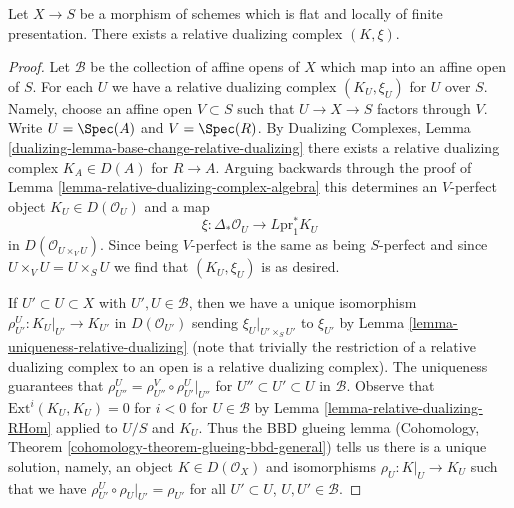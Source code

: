 \begin{lemma}
\label{lemma-existence-relative-dualizing}
Let $X \to S$ be a morphism of schemes which is
flat and locally of finite presentation.
There exists a relative dualizing complex $(K, \xi)$.
\end{lemma}

\begin{proof}
Let $\mathcal{B}$ be the collection of affine opens of
$X$ which map into an affine open of $S$. For each $U$
we have a relative dualizing complex $(K_U, \xi_U)$ for
$U$ over $S$. Namely, choose an affine open
$V \subset S$ such that $U \to X \to S$ factors through $V$.
Write $U = \Spec(A)$ and $V = \Spec(R)$. By
Dualizing Complexes, Lemma \ref{dualizing-lemma-base-change-relative-dualizing}
there exists a relative dualizing complex $K_A \in D(A)$
for $R \to A$. Arguing backwards through the proof of
Lemma \ref{lemma-relative-dualizing-complex-algebra}
this determines an $V$-perfect object $K_U \in D(\mathcal{O}_U)$
and a map
$$
\xi : \Delta_*\mathcal{O}_U \to L\text{pr}_1^*K_U
$$
in $D(\mathcal{O}_{U \times_V U})$. Since being $V$-perfect is the
same as being $S$-perfect and since $U \times_V U = U \times_S U$
we find that $(K_U, \xi_U)$ is as desired.

\medskip\noindent
If $U' \subset U \subset X$ with $U', U \in \mathcal{B}$, then
we have a unique isomorphism $\rho_{U'}^U : K_U|_{U'} \to K_{U'}$
in $D(\mathcal{O}_{U'})$ sending $\xi_U|_{U' \times_S U'}$
to $\xi_{U'}$ by Lemma \ref{lemma-uniqueness-relative-dualizing}
(note that trivially the restriction of a relative dualizing
complex to an open is a relative dualizing complex).
The uniqueness guarantees that
$\rho^U_{U''} = \rho^V_{U''} \circ \rho ^U_{U'}|_{U''}$
for $U'' \subset U' \subset U$ in $\mathcal{B}$.
Observe that $\text{Ext}^i(K_U, K_U) = 0$ for $i < 0$
for $U \in \mathcal{B}$ by Lemma \ref{lemma-relative-dualizing-RHom}
applied to $U/S$ and $K_U$.
Thus the BBD glueing lemma
(Cohomology, Theorem \ref{cohomology-theorem-glueing-bbd-general})
tells us there is a unique solution, namely, an object
$K \in D(\mathcal{O}_X)$ and isomorphisms $\rho_U : K|_U \to K_U$
such that we have
$\rho^U_{U'} \circ \rho_U|_{U'} = \rho_{U'}$ for all $U' \subset U$,
$U, U' \in \mathcal{B}$.


\end{proof}
